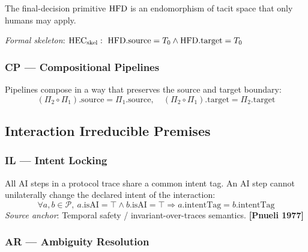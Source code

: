 \begin{axiom_env}
The final-decision primitive $\mathrm{HFD}$ is an endomorphism of tacit space that
only humans may apply.

\emph{Formal skeleton}:
$\mathrm{HEC}_{\mathrm{skel}}:\ \mathrm{HFD}.\mathrm{source} = T_0 \wedge
\mathrm{HFD}.\mathrm{target} = T_0$

\end{axiom_env}

\subsubsection*{CP --- Compositional Pipelines}

\begin{axiom_env}
Pipelines compose in a way that preserves the source and target boundary:
\[
  (\Pi_2 \circ \Pi_1).\mathrm{source} = \Pi_1.\mathrm{source},\quad
  (\Pi_2 \circ \Pi_1).\mathrm{target} = \Pi_2.\mathrm{target}
\]
\end{axiom_env}

\subsection{Interaction Irreducible Premises}
\label{sec:interaction}

\subsubsection*{IL --- Intent Locking}

\begin{axiom_env}
All AI steps in a protocol trace share a common intent tag. An AI step cannot
unilaterally change the declared intent of the interaction:
\[
  \forall a, b \in \mathcal{P},\
  a.\mathrm{isAI} = \top \wedge b.\mathrm{isAI} = \top
  \Rightarrow a.\mathrm{intentTag} = b.\mathrm{intentTag}
\]
\emph{Source anchor}: Temporal safety / invariant-over-traces semantics.
\textbf{[Pnueli 1977]}
\end{axiom_env}

\subsubsection*{AR --- Ambiguity Resolution}

